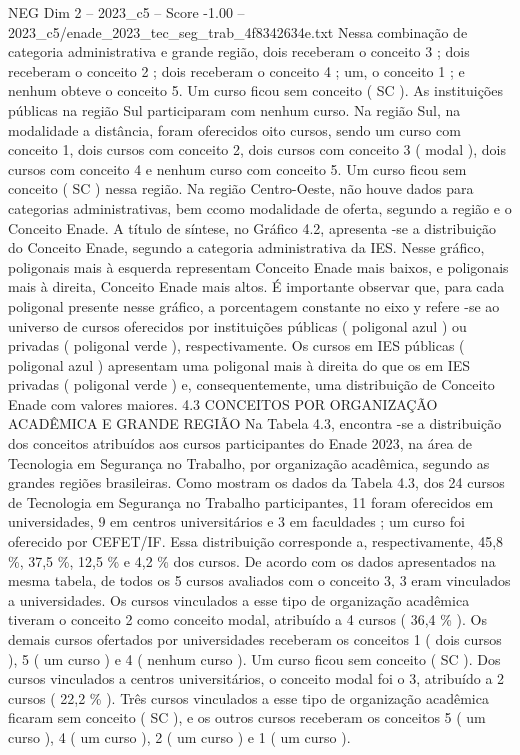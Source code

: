 \begin{textsample}{NEG Dim 2 – 2023\_c5 – Score -1.00 – 2023\_c5/enade\_2023\_tec\_seg\_trab\_4f8342634e.txt}
Nessa combinação de categoria administrativa e grande região, dois receberam o conceito 3 ; dois receberam o conceito 2 ; dois receberam o conceito 4 ; um, o conceito 1 ; e nenhum obteve o conceito 5.
Um curso ficou sem conceito ( SC ).
As instituições públicas na região Sul participaram com nenhum curso.
Na região Sul, na modalidade a distância, foram oferecidos oito cursos, sendo um curso com conceito 1, dois cursos com conceito 2, dois cursos com conceito 3 ( modal ), dois cursos com conceito 4 e nenhum curso com conceito 5.
Um curso ficou sem conceito ( SC ) nessa região.
Na região Centro-Oeste, não houve dados para categorias administrativas, bem ccomo modalidade de oferta, segundo a região e o Conceito Enade.
A título de síntese, no Gráfico 4.2, apresenta -se a distribuição do Conceito Enade, segundo a categoria administrativa da IES.
Nesse gráfico, poligonais mais à esquerda representam Conceito Enade mais baixos, e poligonais mais à direita, Conceito Enade mais altos.
É importante observar que, para cada poligonal presente nesse gráfico, a porcentagem constante no eixo y refere -se ao universo de cursos oferecidos por instituições públicas ( poligonal azul ) ou privadas ( poligonal verde ), respectivamente.
Os cursos em IES públicas ( poligonal azul ) apresentam uma poligonal mais à direita do que os em IES privadas ( poligonal verde ) e, consequentemente, uma distribuição de Conceito Enade com valores maiores. 4.3 CONCEITOS POR ORGANIZAÇÃO ACADÊMICA E GRANDE REGIÃO Na Tabela 4.3, encontra -se a distribuição dos conceitos atribuídos aos cursos participantes do Enade 2023, na área de Tecnologia em Segurança no Trabalho, por organização acadêmica, segundo as grandes regiões brasileiras.
Como mostram os dados da Tabela 4.3, dos 24 cursos de Tecnologia em Segurança no Trabalho participantes, 11 foram oferecidos em universidades, 9 em centros universitários e 3 em faculdades ; um curso foi oferecido por CEFET/IF.
Essa distribuição corresponde a, respectivamente, 45,8 \%, 37,5 \%, 12,5 \% e 4,2 \% dos cursos.
De acordo com os dados apresentados na mesma tabela, de todos os 5 cursos avaliados com o conceito 3, 3 eram vinculados a universidades.
Os cursos vinculados a esse tipo de organização acadêmica tiveram o conceito 2 como conceito modal, atribuído a 4 cursos ( 36,4 \% ).
Os demais cursos ofertados por universidades receberam os conceitos 1 ( dois cursos ), 5 ( um curso ) e 4 ( nenhum curso ).
Um curso ficou sem conceito ( SC ).
Dos cursos vinculados a centros universitários, o conceito modal foi o 3, atribuído a 2 cursos ( 22,2 \% ).
Três cursos vinculados a esse tipo de organização acadêmica ficaram sem conceito ( SC ), e os outros cursos receberam os conceitos 5 ( um curso ), 4 ( um curso ), 2 ( um curso ) e 1 ( um curso ).

\end{textsample}
